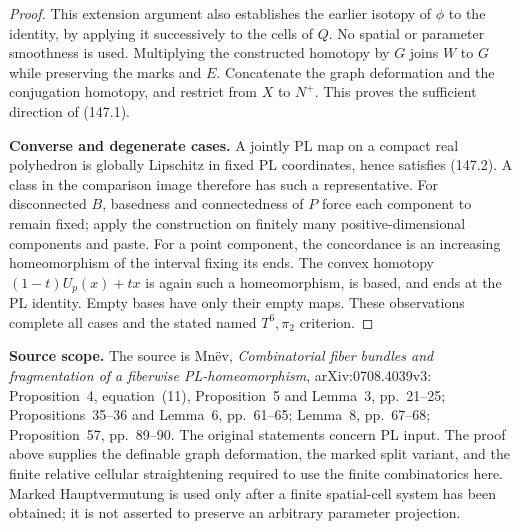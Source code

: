 \begin{proof}
This extension argument also establishes the earlier isotopy of
\(\phi\) to the identity, by applying it successively to the cells
of \(Q\). No spatial or parameter smoothness is used.
Multiplying the constructed homotopy by \(G\) joins \(W\) to \(G\)
while preserving the marks and \(E\). Concatenate the graph
deformation and the conjugation homotopy, and restrict from \(X\)
to \(N^+\). This proves the sufficient direction of (147.1).

\textbf{Converse and degenerate cases.}\quad
A jointly PL map on a compact real polyhedron is globally Lipschitz
in fixed PL coordinates, hence satisfies (147.2). A class in the
comparison image therefore has such a representative.
For disconnected \(B\), basedness and connectedness of \(P\) force
each component to remain fixed; apply the construction on finitely
many positive-dimensional components and paste.
For a point component, the concordance is an increasing homeomorphism
of the interval fixing its ends. The convex homotopy
\((1-t)U_p(x)+tx\) is again such a homeomorphism, is based, and ends
at the PL identity. Empty bases have only their empty maps.
These observations complete all cases and the stated named
\(T^6,\pi_2\) criterion.
\end{proof}

\textbf{Source scope.}\quad
The source is Mn\"ev, \emph{Combinatorial fiber bundles and fragmentation
of a fiberwise PL-homeomorphism}, arXiv:0708.4039v3:
Proposition~4, equation~(11), Proposition~5 and Lemma~3,
pp.~21--25; Propositions~35--36 and Lemma~6, pp.~61--65;
Lemma~8, pp.~67--68; Proposition~57, pp.~89--90.
The original statements concern PL input. The proof above supplies
the definable graph deformation, the marked split variant, and the
finite relative cellular straightening required to use the finite
combinatorics here. Marked Hauptvermutung is used only after a
finite spatial-cell system has been obtained; it is not asserted
to preserve an arbitrary parameter projection.
